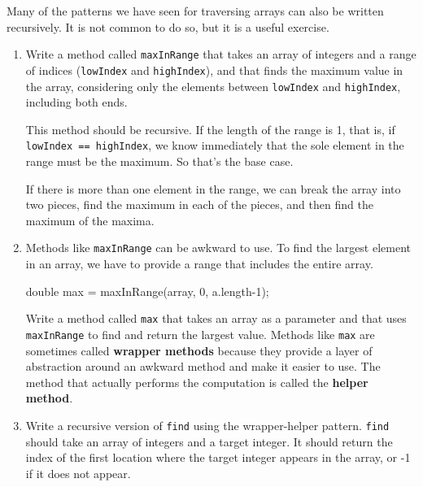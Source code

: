 \begin{exercise}
Many of the patterns we have seen for traversing arrays can
also be written recursively.  It is not common to do so, but
it is a useful exercise.

\begin{enumerate}

\item Write a method called {\tt maxInRange} that takes an array of
integers and a range of indices ({\tt lowIndex} and {\tt highIndex}),
and that finds the maximum value in the array, considering only the
elements between {\tt lowIndex} and {\tt highIndex}, including both
ends.

This method should be recursive.  If the length of the range is 1,
that is, if {\tt lowIndex == highIndex}, we know immediately that the
sole element in the range must be the maximum.  So that's the base
case.

If there is more than one element in the range, we can break the array
into two pieces, find the maximum in each of the pieces, and then find
the maximum of the maxima.

\item Methods like {\tt maxInRange} can be awkward to use.  To
find the largest element in an array, we have to provide a range
that includes the entire array.

\begin{code}
    double max = maxInRange(array, 0, a.length-1);
\end{code}

Write a method called {\tt max} that takes an array as a parameter
and that uses {\tt maxInRange} to find and return the largest value.
Methods like {\tt max} are sometimes called {\bf wrapper methods}
because they provide a layer of abstraction around an awkward method
and make it easier to use.  The method that actually
performs the computation is called the {\bf helper method}.

\item Write a recursive version of {\tt find} using the
wrapper-helper pattern.  {\tt find} should take an array of
integers and a target integer.  It should return the index
of the first location where the target integer appears in the
array, or -1 if it does not appear.

\end{enumerate}
\end{exercise}

